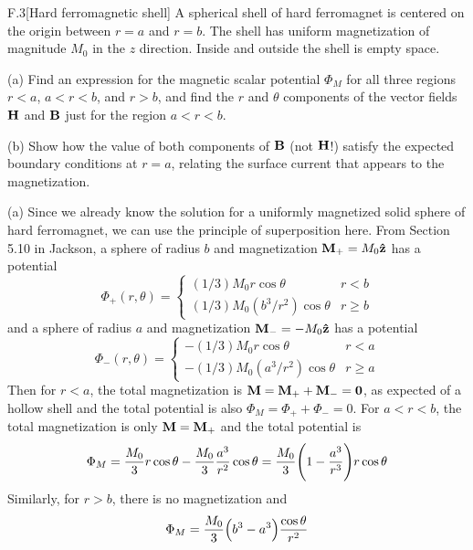 \documentclass[12pt]{article}
\begin{document}
\begin{problem}{F.3}[Hard ferromagnetic shell]
A spherical shell of hard ferromagnet is centered on the origin between $r=a$
and $r=b$. The shell has uniform magnetization of magnitude $M_0$ in the $z$
direction. Inside and outside the shell is empty space.

(a) Find an expression for the magnetic scalar potential $\Phi_M$ for all three
regions $r<a$, $a<r<b$, and $r>b$, and find the $r$ and $\theta$ components of
the vector fields $\vb{H}$ and $\vb{B}$ just for the region $a<r<b$.

(b) Show how the value of both components of $\vb{B}$ (not $\vb{H}$!) satisfy
the expected boundary conditions at $r=a$, relating the surface current that
appears to the magnetization.
\begin{solution}
(a) Since we already know the solution for a uniformly magnetized solid sphere 
of hard ferromagnet, we can use the principle of superposition here. From
Section 5.10 in Jackson, a sphere of radius $b$ and magnetization 
$\vb{M}_+=M_0\vb{\hat{z}}$ has a potential
\begin{equation}
    \Phi_+(r,\theta)=\begin{cases}
        (1/3)M_0r\cos\theta & r<b\\
        (1/3)M_0(b^3/r^2)\cos\theta & r\geq b
    \end{cases}
\end{equation}
and a sphere of radius $a$ and magnetization $\vb{M}_-=-M_0\vb{\hat{z}}$ has a 
potential
\begin{equation}
    \Phi_-(r,\theta)=\begin{cases}
        -(1/3)M_0r\cos\theta & r<a\\
        -(1/3)M_0(a^3/r^2)\cos\theta & r\geq a
    \end{cases}
\end{equation}
Then for $r<a$, the total magnetization is $\vb{M}=\vb{M}_++\vb{M}_-=\vb{0}$, as
expected of a hollow shell and the total potential is also
$\Phi_M=\Phi_++\Phi_-=0$. For $a<r<b$, the total magnetization is only
$\vb{M}=\vb{M}_+$ and the total potential is
\begin{equation}
    \Phi_M=\frac{M_0}{3}r\cos\theta-\frac{M_0}{3}\frac{a^3}{r^2}\cos\theta
    =\frac{M_0}{3}\qty(1-\frac{a^3}{r^3})r\cos\theta
\end{equation}
Similarly, for $r>b$, there is no magnetization and
\begin{equation}
    \Phi_M=\frac{M_0}{3}\qty(b^3-a^3)\frac{\cos\theta}{r^2} 
\end{equation}

\end{solution}
\end{problem}
\end{document}
